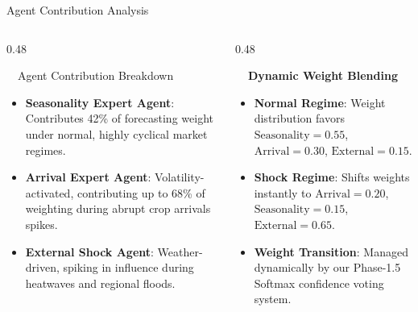 \documentclass{beamer}
\begin{document}
\begin{frame}{Agent Contribution Analysis}
\vspace{-0.2cm}

\begin{columns}[T]
    \begin{column}{0.48\textwidth}
        \begin{infocard}{~~Agent Contribution Breakdown}
            \fontsize{6.8pt}{8.5pt}\selectfont
            \begin{itemize}\setlength\itemsep{4.5pt}\setlength\parskip{0pt}
                \item \textbf{Seasonality Expert Agent}: Contributes 42\% of forecasting weight under normal, highly cyclical market regimes.
                \item \textbf{Arrival Expert Agent}: Volatility-activated, contributing up to 68\% of weighting during abrupt crop arrivals spikes.
                \item \textbf{External Shock Agent}: Weather-driven, spiking in influence during heatwaves and regional floods.
            \end{itemize}
        \end{infocard}
    \end{column}
    
    \begin{column}{0.48\textwidth}
        \begin{smallcard}[0.98\textwidth, top=3pt, bottom=3pt, left=4pt, right=4pt, boxsep=0.5pt]
            \centering \textbf{\textcolor{primaryDark}{\small {}~~Dynamic Weight Blending}}
            \vspace{0.08cm}
            \fontsize{6.8pt}{8.2pt}\selectfont
            \begin{itemize}\setlength\itemsep{4.5pt}\setlength\parskip{0pt}
                \item \textbf{Normal Regime}: Weight distribution favors $\text{Seasonality} = 0.55$, $\text{Arrival} = 0.30$, $\text{External} = 0.15$.
                \item \textbf{Shock Regime}: Shifts weights instantly to $\text{Arrival} = 0.20$, $\text{Seasonality} = 0.15$, $\text{External} = 0.65$.
                \item \textbf{Weight Transition}: Managed dynamically by our Phase-1.5 Softmax confidence voting system.
            \end{itemize}
        \end{smallcard}
    \end{column}
\end{columns}


\end{frame}
\end{document}
